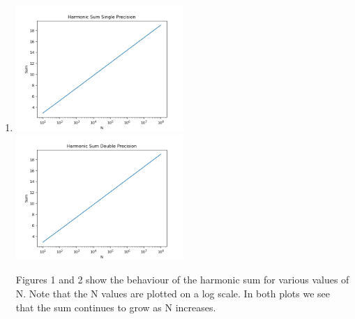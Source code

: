 \documentclass[letterpaper,12pt]{article} %
\begin{document}
\begin{enumerate}

  \item {
    \includegraphics[width=0.5\textwidth, valign=t]{hsumsingle.png}
    \includegraphics[width=0.5\textwidth, valign=t]{hsumdouble.png}

    Figures 1 and 2 show the behaviour of the harmonic sum for various values of N. Note that the N values are plotted on a log scale. In both plots we see that the sum continues to grow as N increases.

}
\end{enumerate}
\end{document}
